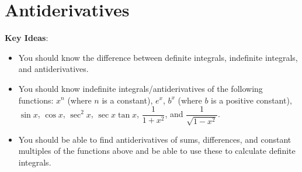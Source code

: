 \documentclass[main]{subfiles}
\begin{document}
\ifSubfilesClassLoaded{%
  \chaptermark{\chapterfive}
}{}

\section{Antiderivatives} \label{ws5-7}

\begin{problemonly}
    \begin{framed}

\textbf{Key Ideas}:

\begin{itemize}[topsep=0pt,partopsep=0pt,parsep=8pt,itemsep=0pt]

\item You should know the difference between definite integrals,
  indefinite integrals, and antiderivatives.

\item You should know indefinite integrals/antiderivatives of the
  following functions: $x^n$ (where $n$ is a constant), $e^x$,
  $b^x$ (where $b$ is a positive constant), $\sin x$, $\cos x$, $\sec^2
  x$, $\sec x \tan x$, $\dfrac{1}{1 + x^2}$, and $\dfrac{1}{\sqrt{1 -
      x^2}}$.

\item You should be able to find antiderivatives of sums, differences, and
  constant multiples of the functions above and be able to use
  these to calculate definite integrals.

\end{itemize}
\end{framed}
\end{problemonly}
\end{document}
